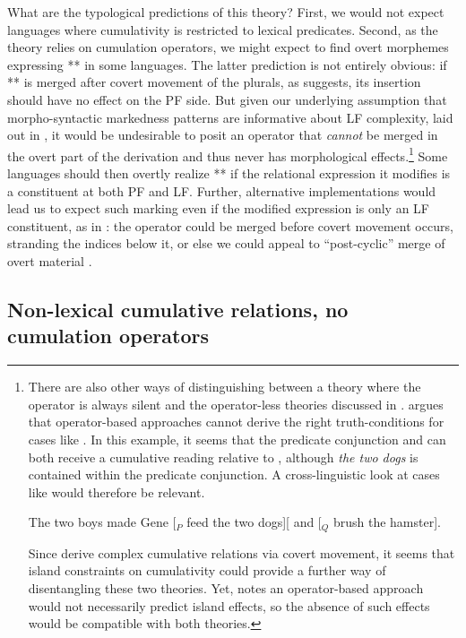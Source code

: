 \documentclass[output=paper]{langscibook}
\begin{document}
What are the typological predictions of this theory? First, we would not expect languages where cumulativity is restricted to lexical predicates. Second, as the theory relies on cumulation operators, we might expect to find overt morphemes expressing ** in some languages. The latter prediction is not entirely obvious: if ** is merged after covert movement of the plurals, as  suggests, its insertion should  have no effect on the PF side. But given our underlying assumption that morpho-syntactic markedness patterns are informative about LF complexity, laid out in , it would be undesirable to posit an operator that \textit{cannot} be merged in the overt part of the derivation and thus never has morphological effects.\footnote{There are also other ways of distinguishing between a theory where the operator is always silent and the operator-less theories discussed in . \citet{Schmitt:2019} argues that operator-based approaches cannot derive the right truth-conditions for cases like . In this example, it seems that the predicate conjunction and  can both receive a cumulative reading relative to , although \textit{the two dogs} is contained within the predicate conjunction. A cross-linguistic look at cases like  would therefore be relevant.

\ea \label{has-sch:gene} The two boys made Gene [$_{P}$ feed the two dogs][ and [$_{Q}$ brush the hamster].
\z
	
\noindent Since \citet{Beck:2000a} derive complex cumulative relations via covert movement, it seems that island constraints on cumulativity could provide a further way of disentangling these two theories. Yet, \citet{Schmitt:2019} notes an operator-based approach would not necessarily predict island effects, so the absence of such effects would be compatible with both theories.\label{has-sch:fn-flattening}} Some languages should then overtly realize  ** if the relational expression it modifies is a constituent at both PF and LF.
Further, alternative implementations would lead us to expect such marking even if the modified expression is only an LF constituent, as in  : the operator could be merged before covert movement occurs, stranding the indices below it, or else we could appeal to ``post-cyclic'' merge of overt material  \citep{Fox:1999}. 

\subsection{Non-lexical cumulative relations, no cumulation operators}\label{has-sch:sec:2.4}
\end{document}
